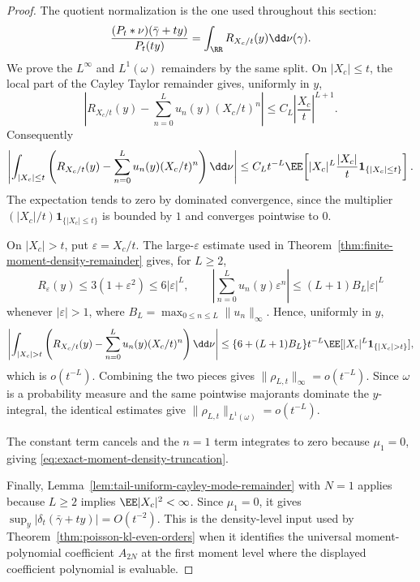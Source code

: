 \begin{proof}
The quotient normalization is the one used throughout this section:
\[
\frac{(P_t*\nu)(\bar{\gamma}+ty)}{P_t(ty)}
=\int_{\RR}R_{X_c/t}(y)\dd\nu(\gamma).
\]
We prove the \(L^\infty\) and \(L^1(\omega)\) remainders by the same split.
On \(|X_c|\le t\), the local part of the Cayley Taylor remainder gives,
uniformly in \(y\),
\[
\left|R_{X_c/t}(y)-\sum_{n=0}^{L}u_n(y)(X_c/t)^n\right|
\le C_L\left|\frac{X_c}{t}\right|^{L+1}.
\]
Consequently
\[
\left|
\int_{|X_c|\le t}\left(
R_{X_c/t}(y)-\sum_{n=0}^{L}u_n(y)(X_c/t)^n
\right)\dd\nu
\right|
\le
C_Lt^{-L}\EE\!\left[
|X_c|^L\frac{|X_c|}{t}\mathbf1_{\{|X_c|\le t\}}
\right].
\]
The expectation tends to zero by dominated convergence, since the multiplier
\((|X_c|/t)\mathbf1_{\{|X_c|\le t\}}\) is bounded by \(1\) and converges
pointwise to \(0\).

On \(|X_c|>t\), put \(\varepsilon=X_c/t\).  The large-\(\varepsilon\)
estimate used in Theorem~\ref{thm:finite-moment-density-remainder} gives,
for \(L\ge2\),
\[
R_{\varepsilon}(y)\le 3(1+\varepsilon^2)\le6|\varepsilon|^L,
\qquad
\left|\sum_{n=0}^{L}u_n(y)\varepsilon^n\right|
\le (L+1)B_L|\varepsilon|^L
\]
whenever \(|\varepsilon|>1\), where
\(B_L=\max_{0\le n\le L}\|u_n\|_\infty\).  Hence, uniformly in \(y\),
\[
\left|
\int_{|X_c|>t}\left(
R_{X_c/t}(y)-\sum_{n=0}^{L}u_n(y)(X_c/t)^n
\right)\dd\nu
\right|
\le
\{6+(L+1)B_L\}t^{-L}\EE[
|X_c|^L\mathbf1_{\{|X_c|>t\}}],
\]
which is \(o(t^{-L})\).  Combining the two pieces gives
\(\|\rho_{L,t}\|_\infty=o(t^{-L})\).  Since \(\omega\) is a probability
measure and the same pointwise majorants dominate the \(y\)-integral, the
identical estimates give \(\|\rho_{L,t}\|_{L^1(\omega)}=o(t^{-L})\).

The constant term cancels and the \(n=1\) term integrates to zero because
\(\mu_1=0\), giving \eqref{eq:exact-moment-density-truncation}.

Finally, Lemma~\ref{lem:tail-uniform-cayley-mode-remainder} with \(N=1\)
applies because \(L\ge2\) implies \(\EE|X_c|^2<\infty\).  Since
\(\mu_1=0\), it gives
\(\sup_y|\delta_t(\bar{\gamma}+ty)|=O(t^{-2})\).
This is the density-level input used by
Theorem~\ref{thm:poisson-kl-even-orders} when it identifies the universal
moment-polynomial coefficient \(A_{2N}\) at the first moment level where the
displayed coefficient polynomial is evaluable.
\end{proof}

